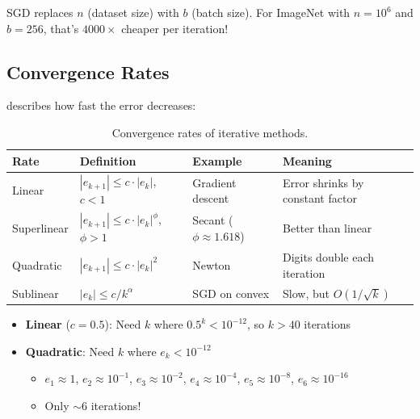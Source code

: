 
 SGD replaces $n$ (dataset size) with $b$ (batch size). For ImageNet with $n = 10^6$ and $b = 256$, that's $4000\times$ cheaper per iteration!



\subsection{Convergence Rates}

 describes how fast the error decreases:

\begin{table}[ht]
\centering
\begin{tabular}{p{}p{}p{}p{}}
\toprule
\textbf{Rate} & \textbf{Definition} & \textbf{Example} & \textbf{Meaning} \\
\midrule
Linear & $|e_{k+1}| \leq c \cdot |e_k|$, $c < 1$ & Gradient descent & Error shrinks by constant factor \\
Superlinear & $|e_{k+1}| \leq c \cdot |e_k|^\phi$, $\phi > 1$ & Secant ($\phi \approx 1.618$) & Better than linear \\
Quadratic & $|e_{k+1}| \leq c \cdot |e_k|^2$ & Newton & Digits double each iteration \\
Sublinear & $|e_k| \leq c / k^\alpha$ & SGD on convex & Slow, but $O(1/\sqrt{k})$ \\
\bottomrule
\end{tabular}
\vspace{2em}
\caption{Convergence rates of iterative methods.}
\label{tab:convergence_rates}
\end{table}


\begin{itemize}
    \item \textbf{Linear} ($c = 0.5$): Need $k$ where $0.5^k < 10^{-12}$, so $k > 40$ iterations
    \item \textbf{Quadratic}: Need $k$ where $e_k < 10^{-12}$
    \begin{itemize}
        \item $e_1 \approx 1$, $e_2 \approx 10^{-1}$, $e_3 \approx 10^{-2}$, $e_4 \approx 10^{-4}$, $e_5 \approx 10^{-8}$, $e_6 \approx 10^{-16}$
        \item Only $\sim 6$ iterations!
    \end{itemize}
\end{itemize}



